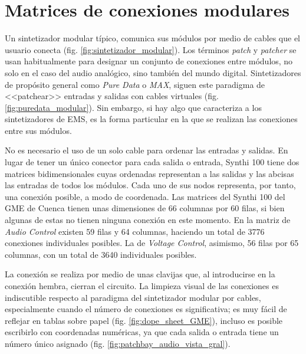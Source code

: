 \section[Matrices de conexiones]{Matrices de conexiones modulares }
\label{sec:patchbay}

Un sintetizador modular típico, comunica sus módulos por medio de cables que el usuario conecta (fig. \ref{fig:sintetizador_modular}). Los términos \textit{patch} y \textit{patcher} se usan habitualmente para designar un conjunto de conexiones entre módulos, no solo en el caso del audio analógico, sino también del mundo digital. Sintetizadores de propósito general como \textit{Pure Data} o \textit{MAX}, siguen este paradigma de <<patchear>> entradas y salidas con cables virtuales (fig. \ref{fig:puredata_modular}). Sin embargo, si hay algo que caracteriza a los sintetizadores de EMS, es la forma particular en la que se realizan las conexiones entre sus módulos. 
%	
%	

No es necesario el uso de un solo cable para ordenar las entradas y salidas. En lugar de tener un único conector para cada salida o entrada, Synthi 100 tiene dos matrices bidimensionales cuyas ordenadas representan a las salidas y las abcisas las entradas de todos los módulos. Cada uno de sus nodos representa, por tanto, una conexión posible, a modo de coordenada. Las matrices del Synthi 100 del GME de Cuenca tienen unas dimensiones de 66 columnas por 60 filas, si bien algunas de estas no tienen ninguna conexión en este momento. En la matriz de \textit{Audio Control} existen 59 filas y 64 columnas, haciendo un total de 3776 conexiones individuales posibles. La de \textit{Voltage Control}, asimismo, 56 filas por 65 columnas, con un total de 3640 individuales posibles.

La conexión se realiza por medio de unas clavijas que, al introducirse en la conexión hembra, cierran el circuito. La limpieza visual de las conexiones es indiscutible respecto al paradigma del sintetizador modular por cables, especialmente cuando el número de conexiones es significativa; es muy fácil de reflejar en tablas sobre papel (fig. \ref{fig:dope_sheet_GME}), incluso es posible escribirlo con coordenadas numéricas, ya que cada salida o entrada tiene un número único asignado (fig. \ref{fig:patchbay_audio_vista_gral}).

